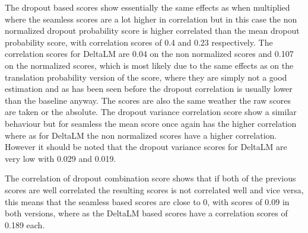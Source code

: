  The dropout based scores show essentially the same effects as when multiplied where the seamless scores are a lot higher in correlation but in this case the non normalized dropout probability score is higher correlated than the mean dropout probability score, with correlation scores of 0.4 and 0.23 respectively. The correlation scores for DeltaLM are 0.04 on the non normalized scores and 0.107 on the normalized scores, which is most likely due to the same effects as on the translation probability version of the score, where they are simply not a good estimation and as has been seen before the dropout correlation is usually lower than the baseline anyway. The scores are also the same weather the raw scores are taken or the absolute. The dropout variance correlation score show a similar behaviour but for seamless the mean score once again has the higher correlation where as for DeltaLM the non normalized scores have a higher correlation. However it should be noted that the dropout variance scores for DeltaLM are very low with 0.029 and 0.019. 

 The correlation of dropout combination score shows that if both of the previous scores are well correlated the resulting scores is not correlated well and vice versa, this means that the seamless based scores are close to 0, with scores of 0.09 in both versions, where as the DeltaLM based scores have a correlation scores of 0.189 each. 

